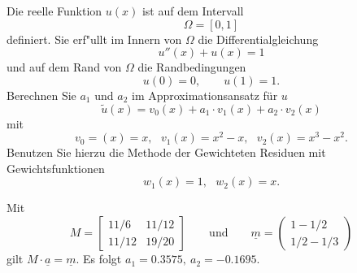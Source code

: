 Die reelle Funktion $u(x)$ ist auf dem Intervall
\[
\Omega = [0, 1]
\]
definiert. Sie erf"ullt im Innern von $\Omega$ die Differentialgleichung
\[
u''(x) + u(x) = 1
\]
und auf dem Rand von $\Omega$ die Randbedingungen
\[
u(0) = 0, \qquad
u(1) = 1.
\]
Berechnen Sie $a_1$ und $a_2$ im Approximationsansatz f\"ur $u$
\[
\tilde u(x) = v_0(x) + a_1 \cdot v_1(x) + a_2 \cdot v_2(x)
\]
mit
\[
v_0=(x) = x, \ \ \ v_1(x) = x^2 - x, \ \ \ v_2(x) = x^3 - x^2.
\]
Benutzen Sie hierzu die Methode der Gewichteten Residuen mit Gewichtsfunktionen
\[
w_1(x) = 1, \ \ \ w_2(x) = x.
\]


\begin{loesung}
Mit 
\[
M
=
\left[
\begin{matrix}
11/6 & 11/12 \\
11/12 & 19/20
\end{matrix}
\right]
\qquad\text{und}\qquad
\underline{m}
=
\begin{pmatrix}
1 - 1/2  \\ 1/2 - 1/3
\end{pmatrix}
\]
gilt $M \cdot \underline{a} = \underline{m}$.
Es folgt $a_1 = 0.3575, \ a_2 = -0.1695$.
\end{loesung}

